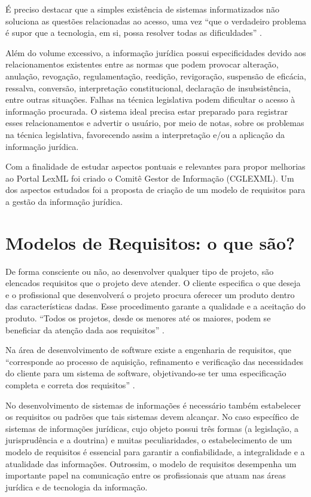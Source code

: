 \documentclass[a4paper,11pt,openright,twoside,brazil]{abntex2}
\begin{document}
É preciso destacar que a simples existência de sistemas informatizados não
soluciona as questões relacionadas ao acesso, uma vez ``que o verdadeiro problema
é supor que a tecnologia, em si, possa resolver todas as dificuldades''
\cite{davenport2001}.

Além do volume excessivo, a informação jurídica possui especificidades devido
aos relacionamentos existentes entre as normas que podem provocar alteração,
anulação, revogação, regulamentação, reedição, revigoração, suspensão de
eficácia, ressalva, conversão, interpretação constitucional, declaração de
insubsistência, entre outras situações. Falhas na técnica legislativa podem
dificultar o acesso à informação procurada. O sistema ideal precisa estar
preparado para registrar esses relacionamentos e advertir o usuário, por meio de
notas, sobre os problemas na técnica legislativa, favorecendo assim a
interpretação e/ou a aplicação da informação jurídica.

Com a finalidade de estudar aspectos pontuais e relevantes para propor melhorias
ao Portal LexML foi criado o Comitê Gestor de Informação (CGLEXML). Um dos
aspectos estudados foi a proposta de criação de um modelo de requisitos para a
gestão da informação jurídica.


\chapter{Modelos de Requisitos: o que são?}

De forma consciente ou não, ao desenvolver qualquer tipo de projeto, são
elencados requisitos que o projeto deve atender. O cliente especifica o que
deseja e o profissional que desenvolverá o projeto procura oferecer um produto
dentro das características dadas. Esse procedimento garante a qualidade e a
aceitação do produto. ``Todos os projetos, desde os menores até os maiores,
podem se beneficiar da atenção dada aos requisitos'' \cite{carvalho2002}.

Na área de desenvolvimento de software existe a engenharia de requisitos, que
``corresponde ao processo de aquisição, refinamento e verificação das
necessidades do cliente para um sistema de software, objetivando-se ter uma
especificação completa e correta dos requisitos'' \cite{carvalho2002}.

No desenvolvimento de sistemas de informações é necessário também estabelecer os
requisitos ou padrões que tais sistemas devem alcançar. No caso específico de
sistemas de informações jurídicas, cujo objeto possui três formas (a legislação,
a jurisprudência e a doutrina) e muitas peculiaridades, o estabelecimento de um
modelo de requisitos é essencial para garantir a confiabilidade, a integralidade
e a atualidade das informações. Outrossim, o modelo de requisitos desempenha um
importante papel na comunicação entre os profissionais que atuam nas áreas
jurídica e de tecnologia da informação.
\end{document}
